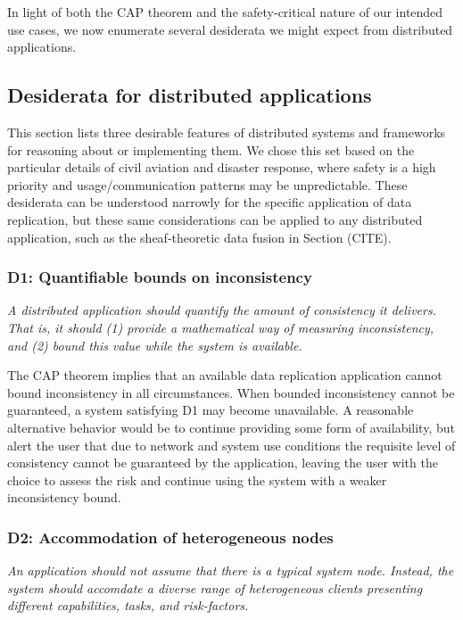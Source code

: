 In light of both the CAP theorem and the safety-critical nature of our
intended use cases, we now enumerate several desiderata we might
expect from distributed applications.

\subsection{Desiderata for distributed applications}

This section lists three desirable features of distributed systems and
frameworks for reasoning about or implementing them. We chose this set
based on the particular details of civil aviation and disaster
response, where safety is a high priority and usage/communication
patterns may be unpredictable. These desiderata can be understood
narrowly for the specific application of data replication, but these
same considerations can be applied to any distributed application,
such as the sheaf-theoretic data fusion in Section (CITE).

\subsubsection*{D1: Quantifiable bounds on inconsistency}

\emph{A distributed application should quantify the amount of consistency
it delivers. That is, it should (1) provide a mathematical way of
measuring inconsistency, and (2) bound this value while the system is
available.}

The CAP theorem implies that an available data replication application
cannot bound inconsistency in all circumstances. When bounded
inconsistency cannot be guaranteed, a system satisfying D1 may become
unavailable. A reasonable alternative behavior would be to continue
providing some form of availability, but alert the user that due to
network and system use conditions the requisite level of consistency
cannot be guaranteed by the application, leaving the user with the
choice to assess the risk and continue using the system with a weaker
inconsistency bound.

\subsubsection*{D2: Accommodation of heterogeneous nodes}

\emph{An application should not assume that there is a typical system
node. Instead, the system should accomdate a diverse range of
heterogeneous clients presenting different capabilities, tasks, and
risk-factors.}


